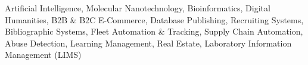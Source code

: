 \begin{par}
  \small{
Artificial Intelligence,
Molecular Nanotechnology,
Bioinformatics,
Digital Humanities,
B2B \& B2C E-Commerce,
Database Publishing,
Recruiting Systems,
Bibliographic Systems,
Fleet Automation \& Tracking,
Supply Chain Automation,
Abuse Detection,
Learning Management,
Real Estate,
Laboratory Information Management (LIMS)}
\end{par}
